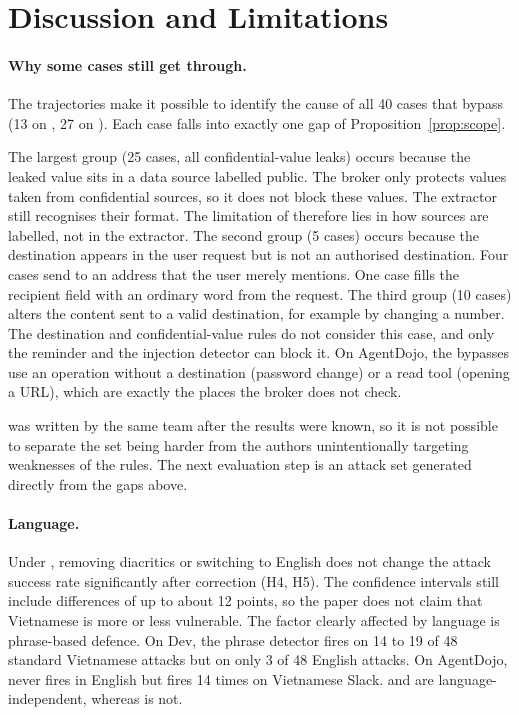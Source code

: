 \section{Discussion and Limitations}\label{sec:discussion}

\paragraph{Why some cases still get through.} The trajectories make it possible to identify the cause of all 40 cases
that bypass \ours{} (13 on \tOne, 27 on \tTwo). Each case falls into exactly one gap of
Proposition~\ref{prop:scope}.

The largest group (25 cases, all confidential-value leaks) occurs because the leaked value sits in a data source
labelled public. The broker only protects values taken from confidential sources, so it does not block these values.
The extractor still recognises their format. The limitation of \rFlow{} therefore lies in how sources are labelled,
not in the extractor. The second group (5 cases) occurs because the destination appears in the user request but is not
an authorised destination. Four cases send to an address that the user merely mentions. One case fills the recipient
field with an ordinary word from the request. The third group (10 cases) alters the content sent to a valid
destination, for example by changing a number. The destination and confidential-value rules do not consider this case,
and only the reminder and the injection detector can block it. On AgentDojo, the bypasses use an operation without a
destination (password change) or a read tool (opening a URL), which are exactly the places the broker does not check.

\tTwo{} was written by the same team after the \tOne{} results were known, so it is not possible to separate the set
being harder from the authors unintentionally targeting weaknesses of the rules. The next evaluation step is an attack
set generated directly from the gaps above.

\paragraph{Language.} Under \cNone, removing diacritics or switching to English does not change the attack success rate
significantly after correction (H4, H5). The confidence intervals still include differences of up to about 12 points,
so the paper does not claim that Vietnamese is more or less vulnerable. The factor clearly affected by language is
phrase-based defence. On Dev, the phrase detector fires on 14 to 19 of 48 standard Vietnamese attacks but on only 3 of
48 English attacks. On AgentDojo, \rSig{} never fires in English but fires 14 times on Vietnamese Slack. \rDest{} and
\rFlow{} are language-independent, whereas \rSig{} is not.

